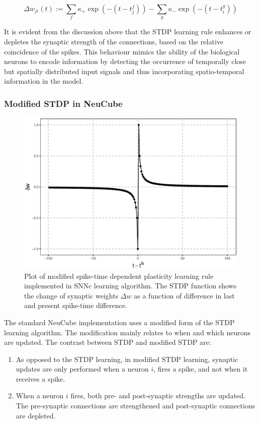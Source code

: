 \begin{equation}
\Delta w_{ji}(t) := \sum_f \kappa_+\exp(-(t-t_j^f))-\sum_g \kappa_- \exp(-(t-t_i^g))
\label{eq:stdp_online}
\end{equation}

It is evident from the discussion above that the STDP learning rule enhances or depletes the synaptic strength of the connections, based on the relative coincidence of the spikes. This behaviour mimics the ability of the biological neurons to encode information by detecting the occurrence of temporally close but spatially distributed input signals and thus incorporating spatio-temporal information in the model.

\subsubsection{Modified STDP in NeuCube} 
\label{subsec:mod_STDP}
\begin{figure}
	\centering
	\includegraphics[width=0.8\linewidth]{fig/largesnn/mod_STDP.eps}
	\caption{Plot of modified spike-time dependent plasticity learning rule implemented in SNNc learning algorithm. The STDP function shows the change of synaptic weights $\Delta w$ as a function of difference in last and present spike-time difference.}
	\label{fig:mod_STDP_exp}
\end{figure}


The standard NeuCube implementation uses a modified form of the STDP learning algorithm. The modification mainly relates to when and which neurons are updated. The contrast between STDP and modified STDP are:

\begin{enumerate}
	\item As opposed to the STDP learning, in modified STDP learning, synaptic updates are only performed when a neuron $i$, fires a spike, and not when it receives a spike.
	\item When a neuron $i$ fires, both pre- and post-synaptic strengths are updated. The pre-synaptic connections are strengthened and post-synaptic connections are depleted. 
\end{enumerate}

